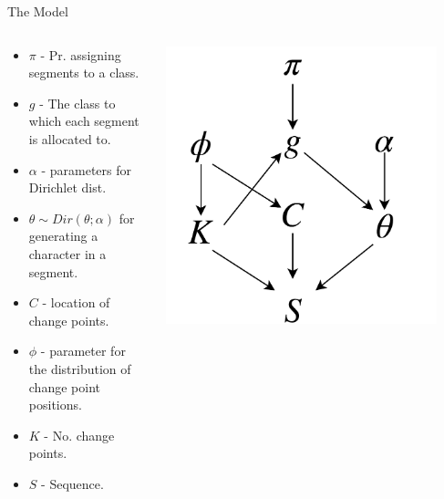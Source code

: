 \documentclass{beamer}
\begin{document}
    \begin{frame}{The Model}
    \begin{columns}
    \begin{column}{0.5\textwidth}
    \begin{itemize}
        \item $\pi$ - Pr. assigning segments to a class.
        \item $g$ - The class to which each segment is allocated to. 
        \item $\alpha$ - parameters for Dirichlet dist.
        \item $\theta\sim Dir(\theta;\alpha)$ for generating a character in a segment.
        \item $C$ - location of change points.
        \item $\phi$ - parameter for the distribution of change point positions.
        \item $K$ - No. change points.
        \item $S$ - Sequence.
    \end{itemize}
    \end{column}
    \begin{column}{0.5\textwidth}  %
    \begin{center}
    \includegraphics[width=0.9\textwidth]{condDep.pdf}\\
    \caption{Conditional dependencies of Change Point. Quantities at the head of an arrow are conditionally dependent on quantities at the tail.}
    \end{center}
\end{column}
\end{columns}
    \end{frame}
\end{document}
